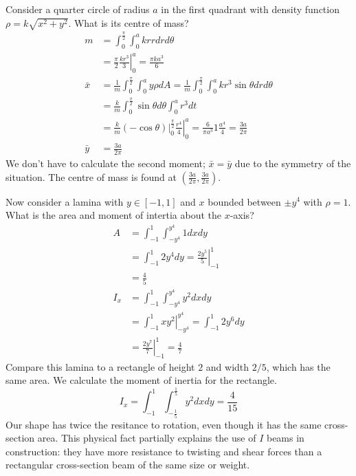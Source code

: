 \documentclass[fleqn,letterpaper]{report}
\begin{document}
\begin{example}
Consider a quarter circle of radius $a$ in the first quadrant
with density function $\rho = k\sqrt{x^2 + y^2}$. What is
its centre of mass?
\begin{align*}
m & = \int_0^{\frac{\pi}{2}} \int_0^a krrdr d\theta \\
& = \frac{\pi}{2} \left. \frac{kr^3}{3} \right|_0^a =
\frac{\pi ka^3}{6} \\
\bar{x} & = \frac{1}{m} \int_0^{\frac{\pi}{2}} \int_0^a y \rho
dA = \frac{1}{m} \int_0^{\frac{\pi}{2}} \int_0^a kr^3 \sin
\theta dr d\theta \\
& = \frac{k}{m} \int_0^{\frac{\pi}{2}} \sin \theta d\theta
\int_0^a r^3 dt \\
& = \frac{k}{m} \left. \left( -\cos \theta \right)
\right|_0^{\frac{\pi}{2}} \left. \frac{r^4}{4} \right|_0^a =
\frac{6}{\pi a^3} 1 \frac{a^4}{4} = \frac{3a}{2\pi}\\
\bar{y} & = \frac{3a}{2\pi}
\end{align*}
We don't have to calculate the second moment; $\bar{x} =
\bar{y}$ due to the symmetry of the situation. The centre of mass
is found at $\left( \frac{3a}{2\pi}, \frac{3a}{2\pi} \right)$. 
\end{example}

\begin{example}
Now consider a lamina with $y \in [-1,1]$ and $x$ bounded
between $\pm y^4$ with $\rho = 1$. What is the area and moment
of intertia about the $x$-axis?
\begin{align*}
A & = \int_{-1}^1 \int_{-y^4}^{y^4}1 dx dy \\
& = \int_{-1}^1 2y^4 dy = \left. \frac{2y^5}{5} \right|_{-1}^1
\\
& = \frac{4}{5} \\
I_x & = \int_{-1}^1 \int_{-y^4}^{y^4} y^2 dx dy \\
& = \int_{-1}^1 \left. xy^2 \right|_{-y^4}^{y^4} = \int_{-1}^1
2y^6 dy \\
& = \left. \frac{2y^7}{7} \right|_{-1}^1 = \frac{4}{7}
\end{align*}
Compare this lamina to a rectangle of height $2$ and width
$2/5$, which has the same area. We calculate the moment of
inertia for the rectangle.
\begin{equation*}
I_x = \int_{-1}^1 \int_{-\frac{1}{5}}^\frac{1}{5} y^2 dx dy =
\frac{4}{15}
\end{equation*}
Our shape has twice the resitance to rotation, even though it
has the same cross-section area. This physical fact 
partially explains the use of $I$ beams in construction: they
have more resistance to twisting and shear forces than a
rectangular cross-section beam of the same size or weight.
\end{example}
\end{document}
